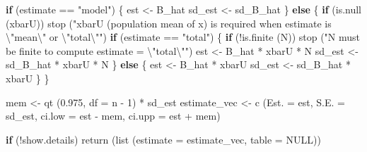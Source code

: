 \documentclass[
  letterpaper,
  DIV=11,
  numbers=noendperiod]{scrreprt}
\newenvironment{Shaded}{\begin{snugshade}}{\end{snugshade}}
\newcommand{\AttributeTok}[1]{\textcolor[rgb]{0.40,0.45,0.13}{#1}}
\newcommand{\ConstantTok}[1]{\textcolor[rgb]{0.56,0.35,0.01}{#1}}
\newcommand{\ControlFlowTok}[1]{\textcolor[rgb]{0.00,0.23,0.31}{\textbf{#1}}}
\newcommand{\DecValTok}[1]{\textcolor[rgb]{0.68,0.00,0.00}{#1}}
\newcommand{\FloatTok}[1]{\textcolor[rgb]{0.68,0.00,0.00}{#1}}
\newcommand{\FunctionTok}[1]{\textcolor[rgb]{0.28,0.35,0.67}{#1}}
\newcommand{\NormalTok}[1]{\textcolor[rgb]{0.00,0.23,0.31}{#1}}
\newcommand{\OtherTok}[1]{\textcolor[rgb]{0.00,0.23,0.31}{#1}}
\newcommand{\SpecialCharTok}[1]{\textcolor[rgb]{0.37,0.37,0.37}{#1}}
\newcommand{\StringTok}[1]{\textcolor[rgb]{0.13,0.47,0.30}{#1}}
\renewcommand{\[}{\begin{equation}}
\renewcommand{\]}{\end{equation}}
\begin{document}
\begin{Shaded}
\begin{Highlighting}[]
  \ControlFlowTok{if}\NormalTok{ (estimate }\SpecialCharTok{==} \StringTok{"model"}\NormalTok{)}
\NormalTok{  \{}
\NormalTok{      est }\OtherTok{\textless{}{-}}\NormalTok{ B\_hat}
\NormalTok{      sd\_est }\OtherTok{\textless{}{-}}\NormalTok{ sd\_B\_hat}
\NormalTok{  \}}
  \ControlFlowTok{else}
\NormalTok{  \{}
      \ControlFlowTok{if}\NormalTok{ (}\FunctionTok{is.null}\NormalTok{ (xbarU))}
          \FunctionTok{stop}\NormalTok{ (}\StringTok{"xbarU (population mean of x) is required when estimate is }\SpecialCharTok{\textbackslash{}"}\StringTok{mean}\SpecialCharTok{\textbackslash{}"}\StringTok{ or }\SpecialCharTok{\textbackslash{}"}\StringTok{total}\SpecialCharTok{\textbackslash{}"}\StringTok{"}\NormalTok{)}
      \ControlFlowTok{if}\NormalTok{ (estimate }\SpecialCharTok{==} \StringTok{"total"}\NormalTok{)}
\NormalTok{      \{}
          \ControlFlowTok{if}\NormalTok{ (}\SpecialCharTok{!}\FunctionTok{is.finite}\NormalTok{ (N))}
              \FunctionTok{stop}\NormalTok{ (}\StringTok{"N must be finite to compute estimate = }\SpecialCharTok{\textbackslash{}"}\StringTok{total}\SpecialCharTok{\textbackslash{}"}\StringTok{"}\NormalTok{)}
\NormalTok{          est }\OtherTok{\textless{}{-}}\NormalTok{ B\_hat }\SpecialCharTok{*}\NormalTok{ xbarU }\SpecialCharTok{*}\NormalTok{ N}
\NormalTok{          sd\_est }\OtherTok{\textless{}{-}}\NormalTok{ sd\_B\_hat }\SpecialCharTok{*}\NormalTok{ xbarU }\SpecialCharTok{*}\NormalTok{ N}
\NormalTok{      \}}
      \ControlFlowTok{else}
\NormalTok{      \{}
\NormalTok{          est }\OtherTok{\textless{}{-}}\NormalTok{ B\_hat }\SpecialCharTok{*}\NormalTok{ xbarU}
\NormalTok{          sd\_est }\OtherTok{\textless{}{-}}\NormalTok{ sd\_B\_hat }\SpecialCharTok{*}\NormalTok{ xbarU}
\NormalTok{      \}}
\NormalTok{  \}}

\NormalTok{  mem }\OtherTok{\textless{}{-}} \FunctionTok{qt}\NormalTok{ (}\FloatTok{0.975}\NormalTok{, }\AttributeTok{df =}\NormalTok{ n }\SpecialCharTok{{-}} \DecValTok{1}\NormalTok{) }\SpecialCharTok{*}\NormalTok{ sd\_est}
\NormalTok{  estimate\_vec }\OtherTok{\textless{}{-}} \FunctionTok{c}\NormalTok{ (}\AttributeTok{Est. =}\NormalTok{ est, }\AttributeTok{S.E. =}\NormalTok{ sd\_est, }\AttributeTok{ci.low =}\NormalTok{ est }\SpecialCharTok{{-}}\NormalTok{ mem, }\AttributeTok{ci.upp =}\NormalTok{ est }\SpecialCharTok{+}\NormalTok{ mem)}

  \ControlFlowTok{if}\NormalTok{ (}\SpecialCharTok{!}\NormalTok{show.details)}
      \FunctionTok{return}\NormalTok{ (}\FunctionTok{list}\NormalTok{ (}\AttributeTok{estimate =}\NormalTok{ estimate\_vec, }\AttributeTok{table =} \ConstantTok{NULL}\NormalTok{))}


\end{Highlighting}
\end{Shaded}
\end{document}
